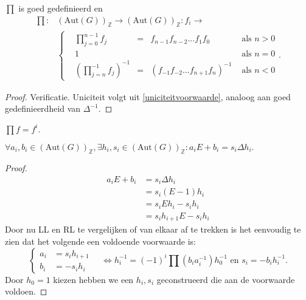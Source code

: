 \documentclass[a4paper,12pt]{article}
\begin{document}
\begin{theorem}
    $\prod$ is goed gedefinieerd en
    \begin{align*}
        \prod: & (\text{Aut}(G))_\mathbb{Z} \rightarrow(\text{Aut}(G))_\mathbb{Z}: f_i \rightarrow                      \\
               & \left\{\begin{aligned}
                             & \prod_{j=0}^{n-1}{f_{j}}       & = & f_{n-1}f_{n-2}...f_1 f_0           & \text{ als } n > 0 \\
                             & 1                              &   &                                    & \text{ als } n = 0 \\
                             & (\prod_{j=n}^{-1}{f_{j}})^{-1} & = & (f_{-1}f_{-2}...f_{n+1}f_{n})^{-1} & \text{ als } n < 0
                        \end{aligned} \right. .
    \end{align*}
\end{theorem}

\begin{proof}
    Verificatie. Uniciteit volgt uit \ref{uniciteitvoorwaarde},
    analoog aan goed gedefinieerdheid van $\Delta^{-1}$.
\end{proof}

\begin{example}
    $\prod{f} = f^i.$
\end{example}

\begin{theorem}
    $
        \forall a_i,b_i \in (\text{Aut}(G))_\mathbb{Z}, \exists h_i,s_i\in (\text{Aut}(G))_\mathbb{Z}:
        a_i E + b_i = s_i \Delta h_i.
    $

\end{theorem}
\begin{proof}
    \begin{align*}
        a_i E + b_i & = s_i \Delta h_i        \\
                    & = s_i(E-1)h_i           \\
                    & = s_i E h_i -s_i h_i    \\
                    & = s_i h_{i+1}E -s_i h_i
    \end{align*}
    Door nu LL en RL te vergelijken of van elkaar af te trekken
    is het eenvoudig te zien dat het volgende een voldoende voorwaarde is:
    $$
        \left\{\begin{aligned}
            a_i & = s_i h_{i+1} \\
            b_i & = -s_i h_i
        \end{aligned} \right. \quad \Leftrightarrow
        h_i^{-1} = (-1)^i\prod{\left(b_ia_i^{-1}\right)} h_0^{-1} \text{ en } s_i = - b_i h_i^{-1}.
    $$
    Door $h_0=1$ kiezen hebben we een $h_i, s_i$ geconstrueerd die aan de voorwaarde voldoen.
\end{proof}
\end{document}
